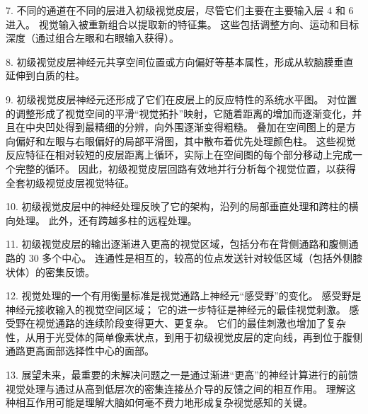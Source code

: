 7. 不同的通道在不同的层进入初级视觉皮层，尽管它们主要在主要输入层 4 和 6 进入。
视觉输入被重新组合以提取新的特征集。
这些包括调整方向、运动和目标深度（通过组合左眼和右眼输入获得）。
 

8. 初级视觉皮层神经元共享空间位置或方向偏好等基本属性，形成从软脑膜垂直延伸到白质的柱。
 


9. 初级视觉皮层神经元还形成了它们在皮层上的反应特性的系统水平图。
对位置的调整形成了视觉空间的平滑“视觉拓扑”映射，它随着距离的增加而逐渐变化，并且在中央凹处得到最精细的分辨，向外围逐渐变得粗糙。
叠加在空间图上的是方向偏好和左眼与右眼偏好的局部平滑图，其中散布着优先处理颜色柱。
这些视觉反应特征在相对较短的皮层距离上循环，实际上在空间图的每个部分移动上完成一个完整的循环。
因此，初级视觉皮层回路有效地并行分析每个视觉位置，以获得全套初级视觉皮层视觉特征。 


10. 初级视觉皮层中的神经处理反映了它的架构，沿列的局部垂直处理和跨柱的横向处理。
此外，还有跨越多柱的远程处理。


11. 初级视觉皮层的输出逐渐进入更高的视觉区域，包括分布在背侧通路和腹侧通路的 30 多个中心。
连通性是相互的，较高的位点发送针对较低区域（包括外侧膝状体）的密集反馈。 


12. 视觉处理的一个有用衡量标准是视觉通路上神经元“感受野”的变化。
感受野是神经元接收输入的视觉空间区域；
它的进一步特征是神经元的最佳视觉刺激。
感受野在视觉通路的连续阶段变得更大、更复杂。
它们的最佳刺激也增加了复杂性，从用于光受体的简单像素状点，到用于初级视觉皮层的定向线，再到位于腹侧通路更高面部选择性中心的面部。


13. 展望未来，最重要的未解决问题之一是通过渐进“更高”的神经计算进行的前馈视觉处理与通过从高到低层次的密集连接丛介导的反馈之间的相互作用。
理解这种相互作用可能是理解大脑如何毫不费力地形成复杂视觉感知的关键。

